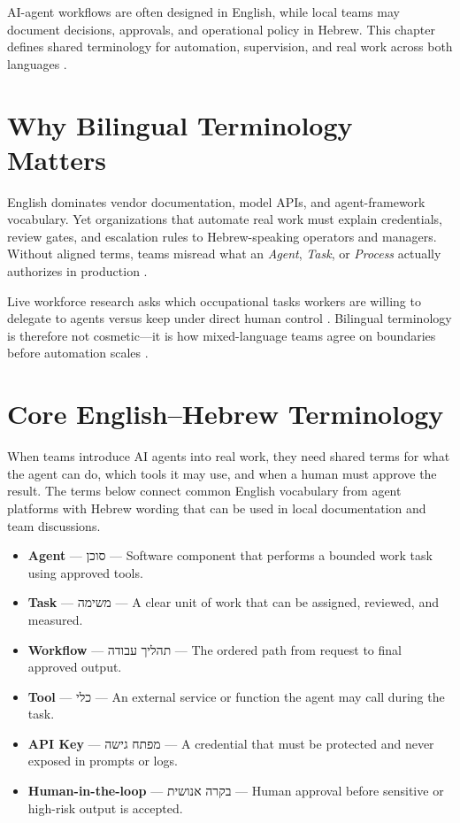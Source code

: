
\begin{chapterintrobox}
AI-agent workflows are often designed in English, while local teams may document decisions,
approvals, and operational policy in Hebrew. This chapter defines shared terminology for
automation, supervision, and real work across both languages \cite{mediumworkflowagents}.
\end{chapterintrobox}

\section{Why Bilingual Terminology Matters}
\label{sec:bidi-why}

English dominates vendor documentation, model APIs, and agent-framework vocabulary. Yet
organizations that automate real work must explain credentials, review gates, and escalation
rules to Hebrew-speaking operators and managers. Without aligned terms, teams misread what
an \emph{Agent}, \emph{Task}, or \emph{Process} actually authorizes in production
\cite{arxiv2506workagents}.

Live workforce research asks which occupational tasks workers are willing to delegate to
agents versus keep under direct human control \cite{arxiv2506workagents}. Bilingual
terminology is therefore not cosmetic---it is how mixed-language teams agree on boundaries
before automation scales \cite{recomaijobroles}.

\section{Core English--Hebrew Terminology}
\label{sec:bidi-glossary}

When teams introduce AI agents into real work, they need shared terms for what the agent
can do, which tools it may use, and when a human must approve the result. The terms below
connect common English vocabulary from agent platforms with Hebrew wording that can be used
in local documentation and team discussions.

\vspace{0.35em}
\begin{itemize}
\item \textbf{Agent} --- \texthebrew{סוכן} --- Software component that performs a bounded work task using approved tools.
\item \textbf{Task} --- \texthebrew{משימה} --- A clear unit of work that can be assigned, reviewed, and measured.
\item \textbf{Workflow} --- \texthebrew{תהליך עבודה} --- The ordered path from request to final approved output.
\item \textbf{Tool} --- \texthebrew{כלי} --- An external service or function the agent may call during the task.
\item \textbf{API Key} --- \texthebrew{מפתח גישה} --- A credential that must be protected and never exposed in prompts or logs.
\item \textbf{Human-in-the-loop} --- \texthebrew{בקרה אנושית} --- Human approval before sensitive or high-risk output is accepted.
\end{itemize}

